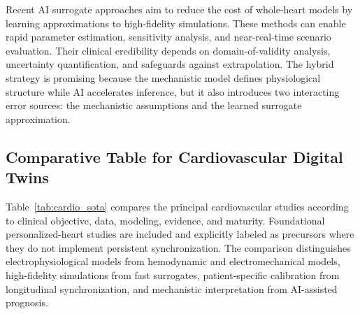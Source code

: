 Recent AI surrogate approaches aim to reduce the cost of whole-heart models by learning approximations to high-fidelity simulations. These methods can enable rapid parameter estimation, sensitivity analysis, and near-real-time scenario evaluation. Their clinical credibility depends on domain-of-validity analysis, uncertainty quantification, and safeguards against extrapolation. The hybrid strategy is promising because the mechanistic model defines physiological structure while AI accelerates inference, but it also introduces two interacting error sources: the mechanistic assumptions and the learned surrogate approximation.

\subsection{Comparative Table for Cardiovascular Digital Twins}
Table~\ref{tab:cardio_sota} compares the principal cardiovascular studies according to clinical objective, data, modeling, evidence, and maturity. Foundational personalized-heart studies are included and explicitly labeled as precursors where they do not implement persistent synchronization. The comparison distinguishes electrophysiological models from hemodynamic and electromechanical models, high-fidelity simulations from fast surrogates, patient-specific calibration from longitudinal synchronization, and mechanistic interpretation from AI-assisted prognosis.


